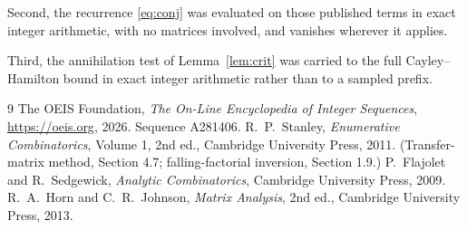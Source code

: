 \documentclass[11pt,a4paper]{article}
\theoremstyle{plain}
\theoremstyle{definition}
\begin{document}
Second, the recurrence \eqref{eq:conj} was evaluated on those published terms in exact
integer arithmetic, with no matrices involved, and vanishes wherever it applies.

Third, the annihilation test of Lemma~\ref{lem:crit} was carried to the full
Cayley--Hamilton bound in exact integer arithmetic rather than to a sampled prefix.

\begin{thebibliography}{9}
 The OEIS Foundation, \emph{The On-Line Encyclopedia of Integer
Sequences}, \url{https://oeis.org}, 2026. Sequence A281406.
 R.~P.~Stanley, \emph{Enumerative Combinatorics}, Volume 1, 2nd ed.,
Cambridge University Press, 2011. (Transfer-matrix method, Section 4.7; falling-factorial
inversion, Section 1.9.)
 P.~Flajolet and R.~Sedgewick, \emph{Analytic Combinatorics}, Cambridge
University Press, 2009.
 R.~A.~Horn and C.~R.~Johnson, \emph{Matrix Analysis}, 2nd ed., Cambridge
University Press, 2013.
\end{thebibliography}
\end{document}
